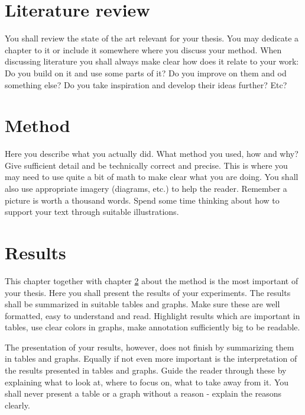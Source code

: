
\chapter{Literature review}\label{ch:Lit_review}

You shall review the state of the art relevant for your thesis. 
You may dedicate a chapter to it or include it somewhere where you discuss your method.
When discussing literature you shall always make clear how does it relate to your work:
Do you build on it and use some parts of it?
Do you improve on them and od something else?
Do you take inspiration and develop their ideas further?
Etc?

\chapter{Method}\label{ch:Method}

Here you describe what you actually did.
What method you used, how and why?
Give sufficient detail and be technically correct and precise.
This is where you may need to use quite a bit of math to make clear what you are doing.
You shall also use appropriate imagery (diagrams, etc.) to help the reader.
Remember a picture is worth a thousand words.
Spend some time thinking about how to support your text through suitable illustrations.

\chapter{Results}\label{ch:Results}

This chapter together with chapter \ref{ch:Method} about the method is the most important of your thesis.
Here you shall present the results of your experiments. 
The results shall be summarized in suitable tables and graphs. 
Make sure these are well formatted, easy to understand and read. 
Highlight results which are important in tables, use clear colors in graphs, make annotation sufficiently big to be readable. 

The presentation of your results, however, does not finish by summarizing them in tables and graphs.
Equally if not even more important is the interpretation of the results presented in tables and graphs.
Guide the reader through these by explaining what to look at, where to focus on, what to take away from it.
You shall never present a table or a graph without a reason - explain the reasons clearly.

